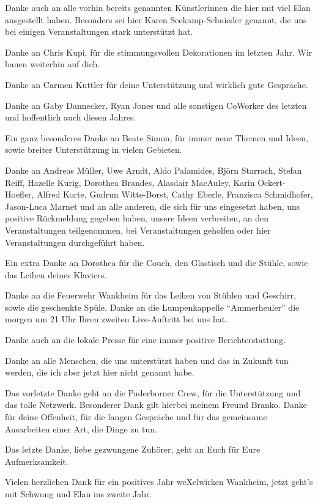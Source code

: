 \begin{appendix}
Danke auch an alle vorhin bereits genannten Künstlerinnen die hier mit viel Elan ausgestellt haben.
Besonders sei hier Karen Seekamp-Schnieder genannt, die uns bei einigen Veranstaltungen stark unterstützt hat.

Danke an Chris Kupi, für die stimmungsvollen Dekorationen im letzten Jahr. Wir bauen weiterhin auf dich.

Danke an Carmen Kuttler für deine Unterstützung und wirklich gute Gespräche.

Danke an Gaby Dannecker, Ryan Jones und alle sonstigen CoWorker des letzten und hoffentlich auch diesen Jahres.

Ein ganz besonderes Danke an Beate Simon, für immer neue Themen und Ideen, sowie breiter Unterstützung in vielen Gebieten.

Danke an Andreas Müller, Uwe Arndt, Aldo Palamides, Björn Starrach, Stefan Reiff, Hazelle Kurig, Dorothea Brandes, Alasdair MacAuley, Karin Ockert-Hoefler, Alfred Korte, Gudrun Witte-Borst, Cathy Eberle, Franzisca Schmidhofer, Jason-Luca Marnet und an alle anderen, die sich für uns eingesetzt haben, uns positive Rückmeldung gegeben haben, unsere Ideen verbreiten, an den Veranstaltungen teilgenommen, bei Veranstaltungen geholfen oder hier Veranstaltungen durchgeführt haben.  

Ein extra Danke an Dorothea für die Couch, den Glastisch und die Stühle, sowie das Leihen deines Klaviers.

Danke an die Feuerwehr Wankheim für das Leihen von Stühlen und Geschirr, sowie die geschenkte Spüle. Danke an die Lumpenkappelle "`Ammerheuler"' die morgen um 21 Uhr Ihren zweiten Live-Auftritt bei uns hat.

Danke auch an die lokale Presse für eine immer positive Berichterstattung.


Danke an alle Menschen, die uns unterstützt haben und das in Zukunft tun werden, die ich aber jetzt hier nicht genannt habe.

Das vorletzte Danke geht an die Paderborner Crew, für die Unterstützung und das tolle Netzwerk.  Besonderer Dank gilt hierbei meinem Freund Branko. Danke für deine Offenheit, für die langen Gespräche und für das gemeinsame Ausarbeiten einer Art, die Dinge zu tun.

Das letzte Danke, liebe gezwungene Zuhörer, geht an Euch für Eure Aufmerksamkeit.

Vielen herzlichen Dank für ein positives Jahr weXelwirken Wankheim, jetzt geht’s mit Schwung und Elan ins zweite Jahr.



\end{appendix}
